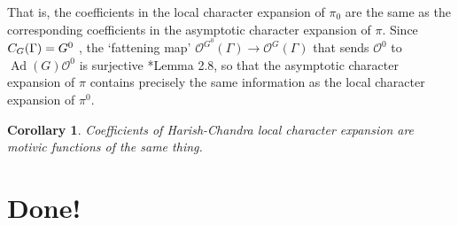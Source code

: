 \documentclass[12pt]{amsart}
\newcommand{\cO}{{\mathcal O}}
\newcommand{\Ad}{\operatorname{Ad}}
\def\cO{\mathcal{O}}
\theoremstyle{plain}
\newtheorem{cor}[thm]{Corollary}
\theoremstyle{definition}
\begin{document}
That is, the coefficients in the local character expansion
of \(\pi_0\) are the same as the corresponding coefficients
in the asymptotic character expansion of \(\pi\).
Since
\(C_G(\Gamma) = G^0\) \citeme,
the `fattening map'
\(\cO^{G^0}(\Gamma) \to \cO^G(\Gamma)\)
that sends \(\cO^0\) to \(\Ad(G)\cO^0\) is surjective
\cite{hc:queens}*{Lemma 2.8},
so that the asymptotic character expansion of
\(\pi\) contains precisely the same information as the local
character expansion of \(\pi^0\).
 
\begin{cor}
Coefficients of Harish-Chandra local character expansion are motivic functions of the same thing.
\end{cor}

\section{Done!}

\begin{bibdiv}
\begin{biblist}
\end{biblist}
\end{bibdiv}
\end{document}
